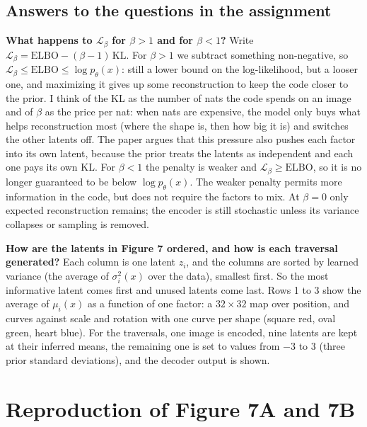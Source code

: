 \subsection{Answers to the questions in the assignment}
\textbf{What happens to $\mathcal L_\beta$ for $\beta>1$ and for $\beta<1$?} Write $\mathcal L_\beta=\text{ELBO}-(\beta-1)\,\mathrm{KL}$. For $\beta>1$ we subtract something non-negative, so $\mathcal L_\beta\le\text{ELBO}\le\log p_\theta(x)$: still a lower bound on the log-likelihood, but a looser one, and maximizing it gives up some reconstruction to keep the code closer to the prior. I think of the KL as the number of nats the code spends on an image and of $\beta$ as the price per nat: when nats are expensive, the model only buys what helps reconstruction most (where the shape is, then how big it is) and switches the other latents off. The paper argues that this pressure also pushes each factor into its own latent, because the prior treats the latents as independent and each one pays its own KL. For $\beta<1$ the penalty is weaker and $\mathcal L_\beta\ge\text{ELBO}$, so it is no longer guaranteed to be below $\log p_\theta(x)$. The weaker penalty permits more information in the code, but does not require the factors to mix. At $\beta=0$ only expected reconstruction remains; the encoder is still stochastic unless its variance collapses or sampling is removed.

\textbf{How are the latents in Figure 7 ordered, and how is each traversal generated?} Each column is one latent $z_i$, and the columns are sorted by learned variance (the average of $\sigma_i^2(x)$ over the data), smallest first. So the most informative latent comes first and unused latents come last. Rows 1 to 3 show the average of $\mu_i(x)$ as a function of one factor: a $32\times32$ map over position, and curves against scale and rotation with one curve per shape (square red, oval green, heart blue). For the traversals, one image is encoded, nine latents are kept at their inferred means, the remaining one is set to values from $-3$ to $3$ (three prior standard deviations), and the decoder output is shown.

\section{Reproduction of Figure 7A and 7B}

